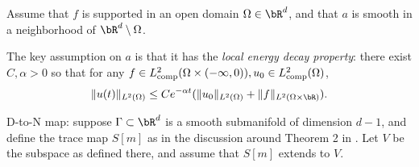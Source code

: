 Assume that 
$f$ is supported in an open domain $\Omega \in \bR^d$, and that $a$ is 
smooth in a neighborhood of  $\bR^d \setminus \Omega$. 

The key assumption on $a$ is that it has the {\em local energy decay
  property}: there exist $C, \alpha >0$ so that for any $f \in
L^2_{\rm comp}(\Omega \times (-\infty,0)), u_0 \in L^2_{\rm comp}(\Omega)$,
\begin{equation}
\label{eqn:decay}
\|u(t)\|_{L^2(\Omega)} \le Ce^{-\alpha t} (\|u_0\|_{L^2(\Omega)} +
\|f\|_{L^2(\Omega \times \bR)}).
\end{equation}

D-to-N map: suppose $\Gamma \subset \bR^d$ is a smooth submanifold of
dimension $d-1$, and define the trace map $S[m]$ as in the discussion
around Theorem 2 in \cite{BlazekStolkSymes:13}. Let $V$ be the
subspace as defined there, and assume that $S[m]$ extends to $V$.




